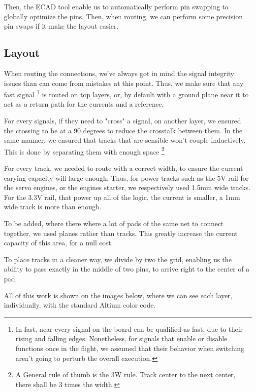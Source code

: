 Then, the ECAD tool enable us to automatically perform pin swapping to globally optimize the pins.
Then, when routing, we can perform some precision pin swaps if it make the layout easier.

\subsection{Layout}
When routing the connections, we've always got in mind the signal integrity issues than can come
from mistakes at this point.
Thus, we make sure that any fast signal \footnote{
    In fast, near every signal on the board can be qualified as fast, due to their rising and falling
    edges. Nonetheless, for signals that enable or disable functions once in the flight, we assumed
    that their behavior when switching aren't going to perturb the overall execution.
} is routed on top layers, or, by default with a ground plane near it to act as a return path for the
currents and a reference.

For every signals, if they need to "cross" a signal, on another layer, we ensured the crossing to be
at a 90 degrees to reduce the crosstalk between them. In the same manner, we ensured that tracks that
are sensible won't couple inductively. This is done by separating them with enough space \footnote{A
    General rule of thumb is the 3W rule. Track center to the next center, there shall be 3 times the
    width.}

For every track, we needed to route with a correct width, to ensure the current carying capacity will
large enough. Thus, for power tracks such as the 5V rail for the servo engines, or the engines starter,
we respectively used 1.5mm wide tracks. For the 3.3V rail, that power up all of the logic, the current
is smaller, a 1mm wide track is more than enough.

To be added, where there where a lot of pads of the same net to connect together, we used planes rather
than tracks. This greatly increase the current capacity of this area, for a null cost.

To place tracks in a cleaner way, we divide by two the grid, enabling us the ability to pass exactly
in the middle of two pins, to arrive right to the center of a pad.

All of this work is shown on the images below, where we can see each layer, individually, with the
standard Altium color code.

